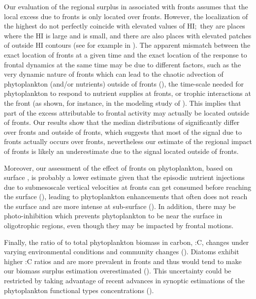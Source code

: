 Our evaluation of the regional surplus in  associated with fronts assumes that the local  excess due to fronts is only located over fronts.
However, the localization of the highest  do not perfectly coincide with elevated values of HI;\ they are places where the HI is large and  is small, and there are also places with elevated patches of  outside HI contours (see for example in ).
The apparent mismatch between the exact location of fronts at a given time and the exact location of the  response to frontal dynamics at the same time may be due to different factors, such as the very dynamic nature of fronts which can lead to the chaotic advection of phytoplankton (and/or nutrients) outside of fronts (\cite{abraham_1998}), the time-scale needed for phytoplankton to respond to nutrient supplies at fronts, or trophic interactions at the front (as shown, for instance, in the modeling study of \textcite{mangolte_2022}).
This implies that part of the excess  attributable to frontal activity may actually be located outside of fronts. Our results show that the median distributions of  significantly differ over fronts and outside of fronts, which suggests that most of the signal due to fronts actually occurs over fronts, nevertheless our estimate of the regional impact of fronts is likely an underestimate due to the signal located outside of fronts.

Moreover, our assessment of the effect of fronts on phytoplankton, based on surface , is probably a lower estimate given that the episodic nutrient injections due to submesoscale vertical velocities at fronts can get consumed before reaching the surface (\cite{johnson_2010}), leading to phytoplankton enhancements that often does not reach the surface and are more intense at sub-surface (\cite{mourino_2004, ruiz_2019}).
In addition, there may be photo-inhibition which prevents phytoplankton to be near the surface in oligotrophic regions, even though they may be impacted by frontal motions.

Finally, the ratio of  to total phytoplankton biomass in carbon, \hbox{:C}, changes under varying environmental conditions and community changes (\cite{behrenfeld_2015, halsey_2015, inomura_2022}).
Diatoms exhibit higher \hbox{:C} ratios and are more prevalent in fronts and thus would tend to make our biomass surplus estimation overestimated (\cite{treguer_2018}).
This uncertainty could be restricted by taking advantage of recent advances in synoptic estimations of the phytoplankton functional types concentrations (\cite{elhourany_2019}).

